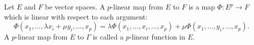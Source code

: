 Let $E$ and $F$ be vector spaces. A $p$-linear map from $E$ to $F$ is a map $\Phi: E^p \to F$ which is linear with respect to each argument:
$$\Phi(x_1, \ldots, \lambda x_i + \mu y_i, \ldots, x_p) = \lambda \Phi(x_1, \ldots, x_i, \ldots, x_p) + \mu \Phi(x_1, \ldots, y_i, \ldots, x_p).$$
A $p$-linear map from $E$ to $\Gamma$ is called a $p$-linear function in $E$.
